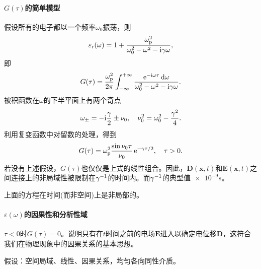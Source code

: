 \paragraph{$G(\tau)$的简单模型}

假设所有的电子都以一个频率$\omega_0$振荡，则 
\[
    \varepsilon_\text r(\omega)=1+\frac{\omega_\text p^2}{\omega_0^2-\omega^2-\mathrm{i}\gamma\omega},
\]
即 
\[
    G(\tau)=\frac{\omega_\text p^2}{2\pi}\int_{-\infty}^{+\infty}\frac{\mathop{}\!\mathrm{e}^{-\mathrm{i}\omega\tau}\mathop{}\!\mathrm{d}\omega}{\omega_0^2-\omega^2-\mathrm{i}\gamma\omega}.
\]
被积函数在$\omega$的下半平面上有两个奇点
\[
    \omega_\pm=-\mathrm{i}\frac\gamma 2\pm\nu_0,\quad\nu_0^2=\omega_0^2-\frac{\gamma^2}4.
\]
利用复变函数中对留数的处理，得到
\[
    G(\tau)=\omega_\text p^2\frac{\sin\nu_0\tau}{\nu_0}\mathop{}\!\mathrm{e}^{-\gamma\tau/2},\quad\tau>0.
\]
若没有上述假设，$G(\tau)$也仅仅是上式的线性组合。因此，$\bm D(\bm x,t)$和$\bm E(\bm x,t)$之间连接上的非局域性被限制在$\gamma^{-1}$的时间内。而$\gamma^{-1}$的典型值$\SI{e-9}s$。

上面的方程在时间(而非空间)上是非局部的。

\paragraph{$\varepsilon(\omega)$的因果性和分析性域}

$\tau<0$时$G(\tau)=0$。说明只有在$t$时间之前的电场$\bm E$进入以确定电位移$\bm D$，这符合我们在物理现象中的因果关系的基本思想。

假设：空间局域、线性、因果关系，均匀各向同性介质。

\newcommand{\PV}{\mathop{}\!\mathrm{P.V.}}

